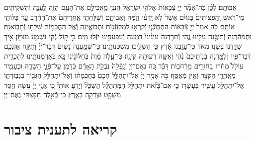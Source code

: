 \documentclass[twoside, openany, parskip=half, 11pt]{book}
\begin{document}
\begin{sometimes}
\begin{footnotesize}
\begin{multicols}{2}
אֲבוֹתָֽם׃ לָכֵ֗ן כֹּֽה־אָמַ֞ר יְיָ֤ צְֿבָאוֹת֙ אֱלֹהֵ֣י יִשְׂרָאֵ֔ל הִנְנִ֧י מַֽאֲכִילָ֛ם אֶת־הָעָ֥ם הַזֶּ֖ה לַֽעֲנָ֑ה וְֿהִשְׁקִיתִ֖ים מֵי־רֹֽאשׁ׃ וַֽהֲפִֽצוֹתִים֙ בַּגּוֹיִ֔ם אֲשֶׁר֙ לֹ֣א יָֽדְֿע֔וּ הֵ֖מָּה וַֽאֲבוֹתָ֑ם וְֿשִׁלַּחְתִּ֤י אַֽחֲרֵיהֶם֙ אֶת־הַחֶ֔רֶב עַ֥ד כַּלּוֹתִ֖י אוֹתָֽם׃ כֹּ֤ה אָמַר֙ יְיָ֣ צְֿבָא֔וֹת הִתְבּֽוֹנְֿנ֛וּ וְֿקִרְא֥וּ לַמְקוֹנְֿנ֖וֹת וּתְבוֹאֶ֑ינָה וְֿאֶל־הַֽחֲכָמ֥וֹת שִׁלְח֖וּ וְֿתָבֽוֹאנָה׃ וּתְמַהֵ֕רְנָה וְֿתִשֶּׂ֥נָה עָלֵ֖ינוּ נֶ֑הִי וְֿתֵרַ֤דְנָה עֵינֵ֨ינוּ֙ דִּמְעָ֔ה וְֿעַפְעַפֵּ֖ינוּ יִזְּֿלוּ־מָֽיִם׃ כִּ֣י ק֥וֹל נְֿהִ֛י נִשְׁמַ֥ע מִצִּיּ֖וֹן אֵ֣יךְ שֻׁדָּ֑דְֿנוּ בֹּ֤שְֿׁנֽוּ מְֿאֹד֙ כִּֽי־עָזַ֣בְנוּ אָ֔רֶץ כִּ֥י הִשְׁלִ֖יכוּ מִשְׁכְּֿנוֹתֵֽינוּ׃ כִּֽי־שְֿֿׁמַ֤עְנָה נָשִׁים֙ דְּבַר־יְיָ֔ וְֿתִקַּ֥ח אָזְֿנְֿכֶ֖ם דְּֿבַר־פִּ֑יו וְֿלַמֵּ֤דְֿנָה בְֿנֽוֹתֵיכֶם֙ נֶ֔הִי וְֿאִשָּׁ֥ה רְֿעוּתָ֖הּ קִינָֽה׃ כִּי־עָ֤לָה מָ֨וֶת֙ בְּֿחַלּוֹנֵ֔ינוּ בָּ֖א בְּֿאַרְמְֿנוֹתֵ֑ינוּ לְֿהַכְרִ֤ית עוֹלָל֙ מִח֔וּץ בַּֽחוּרִ֖ים מֵֽרְֿחֹבֽוֹת׃ דַּבֵּ֗ר כֹּ֚ה נְאֻם־יְיָ֔ וְֿנָֽפְֿלָה֙ נִבְלַ֣ת הָֽאָדָ֔ם כְּֿדֹ֖מֶן עַל־פְּֿֿנֵ֣י הַשָּׂדֶ֑ה וּכְעָמִ֛יר מֵאַֽחֲרֵ֥י הַקֹּצֵ֖ר וְֿאֵ֥ין מְֿאַסֵּֽף׃ כֹּ֣ה אָמַ֣ר יְיָ֗ אַל־יִתְהַלֵּ֤ל חָכָם֙ בְּֿחָכְֿמָת֔וֹ וְֿאַל־יִתְהַלֵּ֥ל הַגִּבּ֖וֹר בִּגְבֽוּרָת֑וֹ אַל־יִתְהַלֵּ֥ל עָשִׁ֖יר בְּֿעָשְֿׁרֽוֹ׃ כִּ֣י אִם־בְּֿֿזֹ֞את יִתְהַלֵּ֣ל הַמִּתְהַלֵּ֗ל הַשְׂכֵּל֘ וְֿיָדֹ֣עַ אוֹתִי֒ כִּ֚י אֲנִ֣י יְיָ֔ עֹ֥שֶׂה חֶ֛סֶד מִשְׁפָּ֥ט וּצְדָקָ֖ה בָּאָ֑רֶץ כִּֽי־בְֿֿאֵ֥לֶּה חָפַ֖צְתִּי נְאֻם־יְיָ׃

\end{multicols}

\section[תענית ציבור]{קריאה לתענית ציבור}\label{torah taanis tzibbur}



\end{footnotesize}
\end{sometimes}
\end{document}
